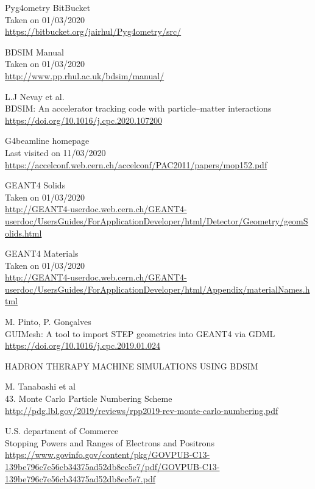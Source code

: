 \documentclass[12pt,a4paper]{article}
\begin{document}
\begin{thebibliography}{1}
	Pyg4ometry BitBucket\\
	Taken on 01/03/2020\\
	\url{https://bitbucket.org/jairhul/Pyg4ometry/src/}
	
	\bibitem{}
		BDSIM Manual\\
		Taken on 01/03/2020\\
		\url{http://www.pp.rhul.ac.uk/bdsim/manual/}
		
		L.J Nevay et al.\\
		BDSIM: An accelerator tracking code with particle–matter interactions\\
		\url{https://doi.org/10.1016/j.cpc.2020.107200}

	
	G4beamline homepage\\
	Last visited on 11/03/2020\\
	\url{https://accelconf.web.cern.ch/accelconf/PAC2011/papers/mop152.pdf}
	
		
	GEANT4 Solids\\
	Taken on 01/03/2020\\
	\url{http://GEANT4-userdoc.web.cern.ch/GEANT4-userdoc/UsersGuides/ForApplicationDeveloper/html/Detector/Geometry/geomSolids.html}
	
	GEANT4 Materials\\
	Taken on 01/03/2020\\
	\url{http://GEANT4-userdoc.web.cern.ch/GEANT4-userdoc/UsersGuides/ForApplicationDeveloper/html/Appendix/materialNames.html}
	
	M. Pinto, P. Gon\c{c}alves\\
	GUIMesh: A tool to import STEP geometries into GEANT4 via GDML\\
	\url{https://doi.org/10.1016/j.cpc.2019.01.024}
	
	HADRON THERAPY MACHINE SIMULATIONS USING BDSIM
		
	M. Tanabashi et al\\
	43. Monte Carlo Particle Numbering Scheme\\
	\url{http://pdg.lbl.gov/2019/reviews/rpp2019-rev-monte-carlo-numbering.pdf}
	
	U.S. department of Commerce\\
	Stopping Powers and Ranges of
	Electrons and Positrons\\
	\url{https://www.govinfo.gov/content/pkg/GOVPUB-C13-139be796c7e56cb34375ad52db8ec5e7/pdf/GOVPUB-C13-139be796c7e56cb34375ad52db8ec5e7.pdf}
	

\end{thebibliography}
\end{document}
